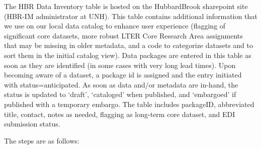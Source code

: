 \documentclass[
  letterpaper,
  DIV=11,
  numbers=noendperiod]{scrreprt}
\begin{document}
The HBR Data Inventory table is hosted on the HubbardBrook sharepoint
site (HBR-IM administrator at UNH). This table contains additional
information that we use on our local data catalog to enhance user
experience (flagging of significant core datasets, more robust LTER Core
Research Area assignments that may be missing in older metadata, and a
code to categorize datasets and to sort them in the initial catalog
view). Data packages are entered in this table as soon as they are
identified (in some cases with very long lead times). Upon becoming
aware of a dataset, a package id is assigned and the entry initiated
with status=anticipated. As soon as data and/or metadata are in-hand,
the status is updated to `draft', `cataloged' when published, and
`embargoed' if published with a temporary embargo. The table includes
packageID, abbreviated title, contact, notes as needed, flagging as
long-term core dataset, and EDI submission status.

The steps are as follows:
\end{document}
